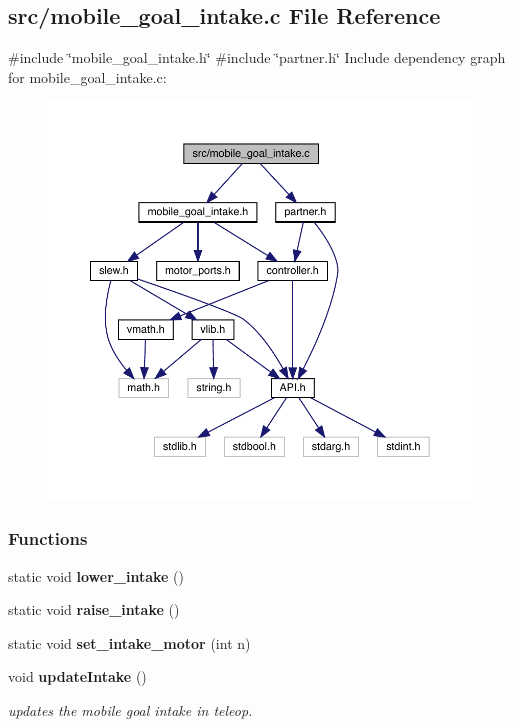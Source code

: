 \subsection{src/mobile\+\_\+goal\+\_\+intake.c File Reference}
\label{mobile__goal__intake_8c}
{\ttfamily \#include \char`\"{}mobile\+\_\+goal\+\_\+intake.\+h\char`\"{}}\newline
{\ttfamily \#include \char`\"{}partner.\+h\char`\"{}}\newline
Include dependency graph for mobile\+\_\+goal\+\_\+intake.\+c\+:\nopagebreak
\begin{figure}[H]
\begin{center}
\leavevmode
\includegraphics[width=350pt]{mobile__goal__intake_8c__incl}
\end{center}
\end{figure}
\subsubsection*{Functions}
\begin{DoxyCompactItemize}
\item 
static void \textbf{ lower\+\_\+intake} ()
\item 
static void \textbf{ raise\+\_\+intake} ()
\item 
static void \textbf{ set\+\_\+intake\+\_\+motor} (int n)
\item 
void \textbf{ update\+Intake} ()
\begin{DoxyCompactList}\small\item\em updates the mobile goal intake in teleop. \end{DoxyCompactList}\end{DoxyCompactItemize}


